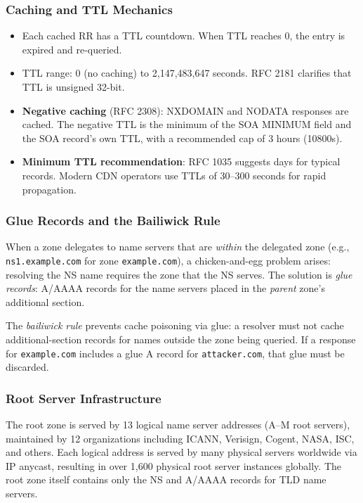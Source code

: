 \documentclass[11pt,letterpaper]{article}
\begin{document}
\subsubsection{Caching and TTL Mechanics}

\begin{itemize}
  \item Each cached RR has a TTL countdown. When TTL reaches 0, the entry is expired and re-queried.
  \item TTL range: 0 (no caching) to 2,147,483,647 seconds. RFC 2181 clarifies that TTL is unsigned 32-bit.
  \item \textbf{Negative caching} (RFC 2308): NXDOMAIN and NODATA responses are cached. The negative TTL is the minimum of the SOA MINIMUM field and the SOA record's own TTL, with a recommended cap of 3 hours (10800s).
  \item \textbf{Minimum TTL recommendation}: RFC 1035 suggests days for typical records. Modern CDN operators use TTLs of 30--300 seconds for rapid propagation.
\end{itemize}

\subsubsection{Glue Records and the Bailiwick Rule}

When a zone delegates to name servers that are \emph{within} the delegated zone (e.g., \texttt{ns1.example.com} for zone \texttt{example.com}), a chicken-and-egg problem arises: resolving the NS name requires the zone that the NS serves. The solution is \emph{glue records}: A/AAAA records for the name servers placed in the \emph{parent} zone's additional section.

The \emph{bailiwick rule} prevents cache poisoning via glue: a resolver must not cache additional-section records for names outside the zone being queried. If a response for \texttt{example.com} includes a glue A record for \texttt{attacker.com}, that glue must be discarded.

\subsubsection{Root Server Infrastructure}

The root zone is served by 13 logical name server addresses (A--M root servers), maintained by 12 organizations including ICANN, Verisign, Cogent, NASA, ISC, and others. Each logical address is served by many physical servers worldwide via IP anycast, resulting in over 1,600 physical root server instances globally. The root zone itself contains only the NS and A/AAAA records for TLD name servers.
\end{document}
